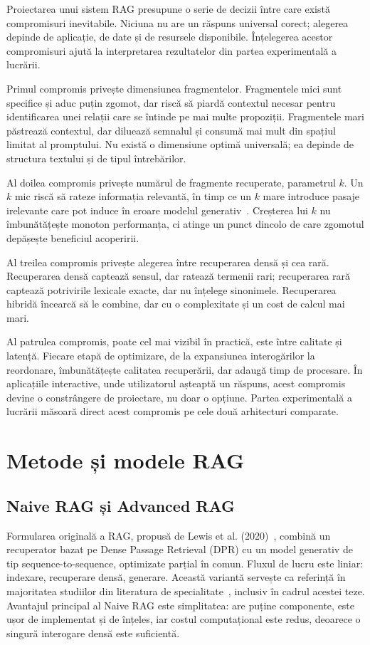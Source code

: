 Proiectarea unui sistem RAG presupune o serie de decizii între care există compromisuri inevitabile. Niciuna nu are un răspuns universal corect; alegerea depinde de aplicație, de date și de resursele disponibile. Înțelegerea acestor compromisuri ajută la interpretarea rezultatelor din partea experimentală a lucrării.

Primul compromis privește dimensiunea fragmentelor. Fragmentele mici sunt specifice și aduc puțin zgomot, dar riscă să piardă contextul necesar pentru identificarea unei relații care se întinde pe mai multe propoziții. Fragmentele mari păstrează contextul, dar diluează semnalul și consumă mai mult din spațiul limitat al promptului. Nu există o dimensiune optimă universală; ea depinde de structura textului și de tipul întrebărilor.

Al doilea compromis privește numărul de fragmente recuperate, parametrul $k$. Un $k$ mic riscă să rateze informația relevantă, în timp ce un $k$ mare introduce pasaje irelevante care pot induce în eroare modelul generativ~\cite{jin2024long}. Creșterea lui $k$ nu îmbunătățește monoton performanța, ci atinge un punct dincolo de care zgomotul depășește beneficiul acoperirii.

Al treilea compromis privește alegerea între recuperarea densă și cea rară. Recuperarea densă captează sensul, dar ratează termenii rari; recuperarea rară captează potrivirile lexicale exacte, dar nu înțelege sinonimele. Recuperarea hibridă încearcă să le combine, dar cu o complexitate și un cost de calcul mai mari.

Al patrulea compromis, poate cel mai vizibil în practică, este între calitate și latență. Fiecare etapă de optimizare, de la expansiunea interogărilor la reordonare, îmbunătățește calitatea recuperării, dar adaugă timp de procesare. În aplicațiile interactive, unde utilizatorul așteaptă un răspuns, acest compromis devine o constrângere de proiectare, nu doar o opțiune. Partea experimentală a lucrării măsoară direct acest compromis pe cele două arhitecturi comparate.

\section{Metode și modele RAG}

\subsection{Naive RAG și Advanced RAG}

Formularea originală a RAG, propusă de Lewis et al. (2020)~\cite{lewis2020rag}, combină un recuperator bazat pe Dense Passage Retrieval (DPR) cu un model generativ de tip sequence-to-sequence, optimizate parțial în comun. Fluxul de lucru este liniar: indexare, recuperare densă, generare. Această variantă servește ca referință în majoritatea studiilor din literatura de specialitate~\cite{gao2024retrievalaugmentedgenerationlargelanguage}, inclusiv în cadrul acestei teze. Avantajul principal al Naive RAG este simplitatea: are puține componente, este ușor de implementat și de înțeles, iar costul computațional este redus, deoarece o singură interogare densă este suficientă.

